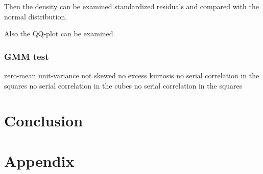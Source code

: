 \documentclass[a4paper, twoside]{templates/ociamthesis}
\newcommand*{\bibtitle}{Works Cited}
\begin{document}
Then the density can be examined standardized residuals and compared with the normal distribution.

Also the QQ-plot can be examined.

\hypertarget{gmm-test}{%
\subsection{GMM test}\label{gmm-test}}

zero-mean
unit-variance
not skewed
no excess kurtosis
no serial correlation in the squares
no serial correlation in the cubes
no serial correlation in the squares

\hypertarget{conclusion}{%
\chapter*{Conclusion}\label{conclusion}}

\startappendices

\hypertarget{appendix}{%
\chapter{Appendix}\label{appendix}}




\setlength{\baselineskip}{0pt} %

{\renewcommand*\MakeUppercase[1]{#1}%
\printbibliography[heading=bibintoc,title={\bibtitle}]}
\end{document}
